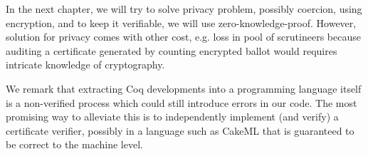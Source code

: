  In the next chapter, we will try to solve privacy problem, possibly coercion, using encryption, and to keep 
 it verifiable, we will use zero-knowledge-proof. However, solution for privacy comes with other cost, e.g. 
 loss in pool of scrutineers because auditing a certificate generated by counting encrypted ballot 
 would requires intricate knowledge of cryptography.  
 
We remark that extracting Coq developments into a
programming language itself is a non-verified process which could
still introduce errors in our code. The most promising way to
alleviate this is to independently implement (and verify) a
certificate verifier, possibly in a language such as CakeML
\cite{Kumar:2014:CVI} that is guaranteed to
be correct to the machine level. 
